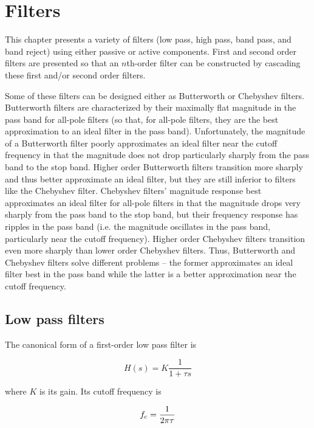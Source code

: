 \chapter{Filters}
This chapter presents a variety of filters (low pass, high pass, band pass, and band reject) using either passive or active components.
First and second order filters are presented so that an $n$th-order filter can be constructed by cascading these first and/or second order filters.

Some of these filters can be designed either as Butterworth or Chebyshev filters.
Butterworth filters are characterized by their maximally flat magnitude in the pass band for all-pole filters (so that, for all-pole filters, they are the best approximation to an ideal filter in the pass band).
Unfortunately, the magnitude of a Butterworth filter poorly approximates an ideal filter near the cutoff frequency in that the magnitude does not drop particularly sharply from the pass band to the stop band.
Higher order Butterworth filters transition more sharply and thus better approximate an ideal filter, but they are still inferior to filters like the Chebyshev filter.
Chebyshev filters' magnitude response best approximates an ideal filter for all-pole filters in that the magnitude drops very sharply from the pass band to the stop band, but their frequency response has ripples in the pass band (i.e. the magnitude oscillates in the pass band, particularly near the cutoff frequency).
Higher order Chebyshev filters transition even more sharply than lower order Chebyshev filters.
Thus, Butterworth and Chebyshev filters solve different problems -- the former approximates an ideal filter best in the pass band while the latter is a better approximation near the cutoff frequency. \autocite[107, 111]{op-amp-circuits-johnson}

\section{Low pass filters}

The canonical form of a first-order low pass filter is

\begin{equation}
	H(s) = K\frac{1}{1 + \tau s}
	\label{eq:1storderLPF}
\end{equation}

where \(K\) is its \DC gain.
Its cutoff frequency is

\begin{equation}
	f_\mathrm{c} = \frac{1}{2\pi\tau}
	\label{eq:1storderLPFtimeconstant}
\end{equation}

